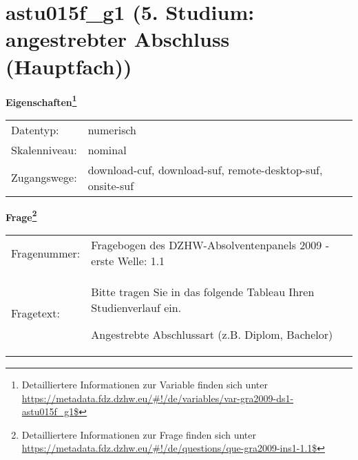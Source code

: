 
    \setcounter{footnote}{0}

    \vspace*{-1.8cm}
	\section{astu015f\_g1 (5. Studium: angestrebter Abschluss (Hauptfach))}
	\label{section:astu015f_g1}



    \vspace*{0.5cm}
    \noindent\textbf{Eigenschaften\footnote{Detailliertere Informationen zur Variable finden sich unter
		\url{https://metadata.fdz.dzhw.eu/\#!/de/variables/var-gra2009-ds1-astu015f_g1$}}}\\
	\begin{tabularx}{\hsize}{@{}lX}
	Datentyp: & numerisch \\
	Skalenniveau: & nominal \\
	Zugangswege: &
	  download-cuf, 
	  download-suf, 
	  remote-desktop-suf, 
	  onsite-suf
 \\
    \end{tabularx}



				\vspace*{0.5cm}
                \noindent\textbf{Frage\footnote{Detailliertere Informationen zur Frage finden sich unter
		              \url{https://metadata.fdz.dzhw.eu/\#!/de/questions/que-gra2009-ins1-1.1$}}}\\
				\begin{tabularx}{\hsize}{@{}lX}
					Fragenummer: &
					  Fragebogen des DZHW-Absolventenpanels 2009 - erste Welle:
					  1.1
 \\
					Fragetext: & Bitte tragen Sie in das folgende Tableau Ihren Studienverlauf ein.\par  Angestrebte Abschlussart (z.B. Diplom, Bachelor) \\
				\end{tabularx}





